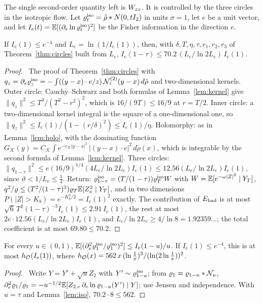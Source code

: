 The single second-order quantity left is $W_{zz}$.
It is controlled by the three circles in the isotropic flow.
Let $\varrho^{\rm iso}_t=\tilde\rho*N(0,tI_2)$ in units $\sigma=1$, let $e$ be a unit vector, and let $I_e(t)=\mathbb{E}[(\partial_e\ln\varrho^{\rm iso}_t)^2]$ be the Fisher information in the direction $e$.

\begin{lemma}\label{lem:iso}
If $I_e(1)\le e^{-4}$ and $L_e=\ln(1/I_e(1))$, then, with $\delta,T,\eta,\tau,r_1,r_2,r_3$ of Theorem~\ref{thm:circles} built from $L_e$, $I_e(1-\tau)\le70.2\,(L_e/\ln2L_e)\,I_e(1)$.
\end{lemma}
\begin{proof}\proofst\
The proof of Theorem~\ref{thm:circles} with $q_z=\partial_e\varrho^{\rm iso}_z=-\int((y-x)\cdot e/z)\,\mathcal N^{(2)}_z(y-x)\,d\tilde\rho$ and two-dimensional kernels.
Outer circle: Cauchy--Schwarz and both formulas of Lemma~\ref{lem:kernel} give $\|q_z\|^2\le T^3/(T^2-r^2)^2$, which is $16/(9T)\le16/9$ at $r=T/2$.
Inner circle: a two-dimensional kernel integral is the square of a one-dimensional one, so $\|q_z\|^2\le I_e(1)/(1-(r/\delta)^2)\le I_e(1)/\eta$.
Holomorphy: as in Lemma~\ref{lem:holo}, with the dominating function $G_{\mathcal K}(y)=C_{\mathcal K}\int e^{-c_{\mathcal K}|y-x|^2}\,|(y-x)\cdot e|^2\,d\tilde\rho(x)$, which is integrable by the second formula of Lemma~\ref{lem:kernel}.
Three circles: $\|q_{1-\tau}\|^2\le e(16/9)^{1/4}(4L_e/\ln2L_e)I_e(1)\le12.56(L_e/\ln2L_e)I_e(1)$, since $\vartheta<1/L_e\le\frac14$.
Return: $\varrho^{\rm iso}_{1-\tau}=(T/(1-\tau))\varrho^{\rm iso}_TW$ with $W=\mathbb{E}[e^{-\omega|Z|^2}\mid Y_T]$, $q^2/\varrho\le(T^2/(1-\tau)^3)\varrho_T\mathbb{E}[Z_e^2\mid Y_T]$, and in two dimensions $P(|Z|>K_b)=e^{-K_b^2/2}=I_e(1)^2$ exactly.
The contribution of $E_{\rm bad}$ is at most $\sqrt6\,T^2(1-\tau)^{-3}I_e(1)\le2.91\,I_e(1)$, the rest at most $2e\cdot12.56(L_e/\ln2L_e)I_e(1)$, and $L_e/\ln2L_e\ge4/\ln8=1.92359\ldots$; the total coefficient is at most $69.80\le70.2$.
\end{proof}

\begin{lemma}\label{lem:sm}
For every $u\in(0,1)$, $\mathbb{E}[(\partial_e^2\varrho^{\rm iso}_1/\varrho^{\rm iso}_1)^2]\le I_e(1-u)/u$. If $I_e(1)\le e^{-4}$, this is at most $h_{\mathcal O}(I_e(1))$, where $h_{\mathcal O}(x)=562\,x\,(\ln\frac1x)^3/(\ln(2\ln\frac1x))^2$.
\end{lemma}
\begin{proof}\proofst\
Write $Y=Y'+\sqrt uZ_2$ with $Y'\sim\varrho^{\rm iso}_{1-u}$; from $\varrho_1=\varrho_{1-u}*\mathcal N_u$, $\partial_e^2\varrho_1/\varrho_1=-u^{-1/2}\mathbb{E}[Z_{2,e}\,\partial_e\ln\varrho_{1-u}(Y')\mid Y]$; use Jensen and independence.
With $u=\tau$ and Lemma~\ref{lem:iso}, $70.2\cdot8\le562$.
\end{proof}

